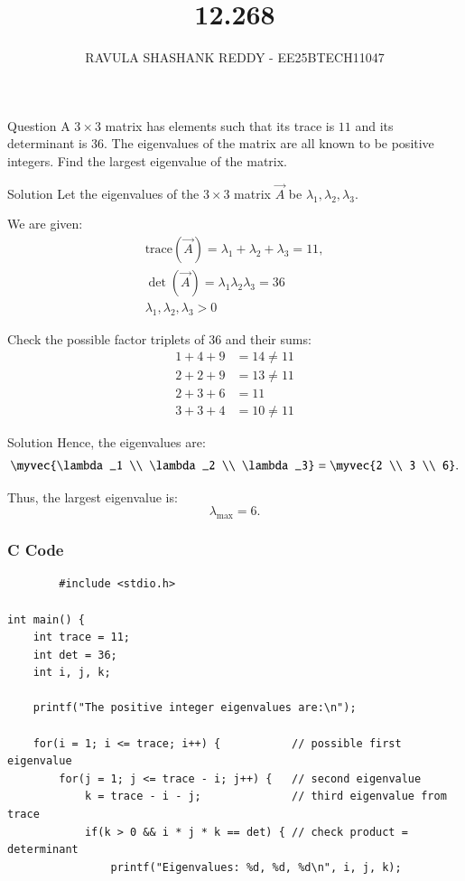 \documentclass{beamer}
\title %
{12.268}
\author %
{RAVULA SHASHANK REDDY - EE25BTECH11047}
\begin{document}
	
	
	\frame{\titlepage}
	\begin{frame}{Question}
    A $3 \times 3$ matrix has elements such that its trace is $11$ and its determinant is $36$. The eigenvalues of the matrix are all known to be positive integers. Find the largest eigenvalue of the matrix.
\end{frame}
\begin{frame}{Solution}
    Let the eigenvalues of the $3 \times 3$ matrix $\vec{A}$ be $\lambda_1, \lambda_2, \lambda_3$.  

We are given:
\begin{align}
\text{trace}(\vec{A}) = \lambda_1 + \lambda_2 + \lambda_3 = 11,\\ 
\det(\vec{A}) = \lambda_1 \lambda_2 \lambda_3 = 36\\
\lambda_1, \lambda_2, \lambda_3 > 0
\end{align}

Check the possible factor triplets of 36 and their sums:
\begin{align}
1 + 4 + 9 &= 14 \not=11 \\
2 + 2 + 9 &= 13 \not=11\\
2 + 3 + 6 &= 11 \\
3 + 3 + 4 &= 10 \not=11
\end{align}
\end{frame}
\begin{frame}{Solution}
Hence, the eigenvalues are:
\begin{align}
\myvec{\lambda_1 \\ \lambda_2 \\ \lambda_3} = \myvec{2 \\ 3 \\ 6}.
\end{align}

Thus, the largest eigenvalue is:
\[
\lambda_{\max} = 6.
\]
\end{frame}
\begin{frame}[fragile]
\frametitle{C Code}
    \begin{lstlisting}
        #include <stdio.h>

int main() {
    int trace = 11;
    int det = 36;
    int i, j, k;

    printf("The positive integer eigenvalues are:\n");

    for(i = 1; i <= trace; i++) {           // possible first eigenvalue
        for(j = 1; j <= trace - i; j++) {   // second eigenvalue
            k = trace - i - j;              // third eigenvalue from trace
            if(k > 0 && i * j * k == det) { // check product = determinant
                printf("Eigenvalues: %d, %d, %d\n", i, j, k);
                \end{lstlisting}
                \end{frame}
\end{document}
